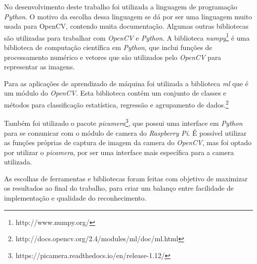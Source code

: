 No desenvolvimento deste trabalho foi utilizada a linguagem de programação \emph{Python}. O motivo da escolha dessa linguagem se dá por ser uma linguagem muito usada para OpenCV\@, contendo muita documentação. Algumas outras bibliotecas são utilizadas para trabalhar com \emph{OpenCV} e \emph{Python}. A biblioteca \emph{numpy}\footnote{http://www.numpy.org/} é uma biblioteca de computação científica em \emph{Python}, que inclui funções de processamento numérico e vetores que são utilizados pelo \emph{OpenCV} para representar as imagens. 

Para as aplicações de aprendizado de máquina foi utilizada a biblioteca \emph{ml} que é um módulo do \emph{OpenCV}. Esta biblioteca contém um conjunto de classes e métodos para classificação estatística, regressão e agrupamento de dados.\footnote{http://docs.opencv.org/2.4/modules/ml/doc/ml.html}

Também foi utilizado o pacote \emph{picamera}\footnote{https://picamera.readthedocs.io/en/release-1.12/},
que possui uma interface em \emph{Python} para se comunicar com o módulo de camera do \emph{Raspberry Pi}.
É possível utilizar as funções próprias de captura de imagem da camera do \emph{OpenCV}, mas foi optado por utilizar o \emph{picamera}, por ser uma interface mais específica para a camera utilizada.

As escolhas de ferramentas e bibliotecas foram feitas
com objetivo de maximizar os resultados ao final do trabalho, para criar
um balanço entre facilidade de implementação e qualidade do reconhecimento.
